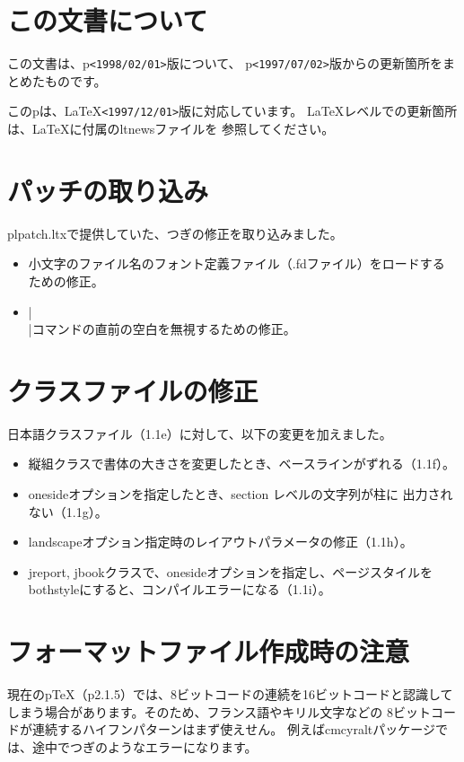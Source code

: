 \documentclass{plnews}
\author{中野 賢（\texttt{<ken-na at ascii.co.jp>}）
     \& 富樫 秀昭（\texttt{<hideak-t at ascii.co.jp>}）
}
\begin{document}
\maketitle

\section{この文書について}
この文書は、p\LaTeXe{}\texttt{<1998/02/01>}版について、
p\LaTeXe{}\texttt{<1997/07/02>}版からの更新箇所をまとめたものです。

このp\LaTeXe{}は、\LaTeX{}\texttt{<1997/12/01>}版に対応しています。
\LaTeX{}レベルでの更新箇所は、\LaTeX{}に付属のltnewsファイルを
参照してください。

\section{パッチの取り込み}
plpatch.ltxで提供していた、つぎの修正を取り込みました。

\begin{itemize}
\item 小文字のファイル名のフォント定義ファイル（.fdファイル）をロードする
ための修正。
\item |\\|コマンドの直前の空白を無視するための修正。
\end{itemize}

\section{クラスファイルの修正}
日本語クラスファイル（1.1e）に対して、以下の変更を加えました。

\begin{itemize}
\item 縦組クラスで書体の大きさを変更したとき、ベースラインがずれる（1.1f）。
\item onesideオプションを指定したとき、section レベルの文字列が柱に
      出力されない（1.1g）。
\item landscapeオプション指定時のレイアウトパラメータの修正（1.1h）。
\item jreport, jbookクラスで、onesideオプションを指定し、ページスタイルを
      bothstyleにすると、コンパイルエラーになる（1.1i）。
\end{itemize}

\section{フォーマットファイル作成時の注意}
現在のp\TeX{}（p2.1.5）では、8ビットコードの連続を16ビットコードと認識して
しまう場合があります。そのため、フランス語やキリル文字などの
8ビットコードが連続するハイフンパターンはまず使えせん。
例えばcmcyraltパッケージでは、途中でつぎのようなエラーになります。
\end{document}
